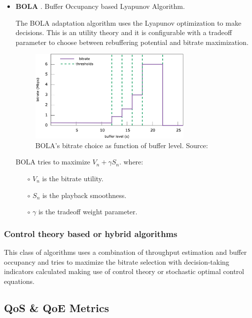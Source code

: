 \begin{itemize}
  \item \textbf{BOLA} \cite{bola1}. Buffer Occupancy based Lyapunov Algorithm.
  
  The BOLA adaptation algorithm uses the Lyapunov optimization to make decisions. This is an utility 
  theory and it is configurable with a tradeoff parameter to choose between rebuffering potential and bitrate
  maximization.
  
  \begin{figure}[h]
    \centering
    \includegraphics[width=0.75\textwidth]{img/BOLA.png}
    \caption{BOLA's bitrate choice as function of buffer level. Source: \cite{bola1}}
    \label{fig:bola}
  \end{figure}

  BOLA tries to maximize ${V_{n}+\gamma S_{n}}$.
  where: 
  \begin{itemize}
    \item[$\circ$] \textbf{${V_{n}}$} is the bitrate utility.
    \item[$\circ$] \textbf{${S_{n}}$} is the playback smoothness.
    \item[$\circ$] \textbf{${\gamma}$} is the tradeoff weight parameter.
  \end{itemize}
\end{itemize}


\subsubsection{Control theory based or hybrid algorithms}

This class of algorithms uses a combination of throughput estimation and buffer occupancy and tries to 
maximize the bitrate selection with decision-taking indicators calculated making use of control theory or
stochastic optimal control equations.

\subsection{QoS \& QoE Metrics}
\label{sec:qoemetrics}


